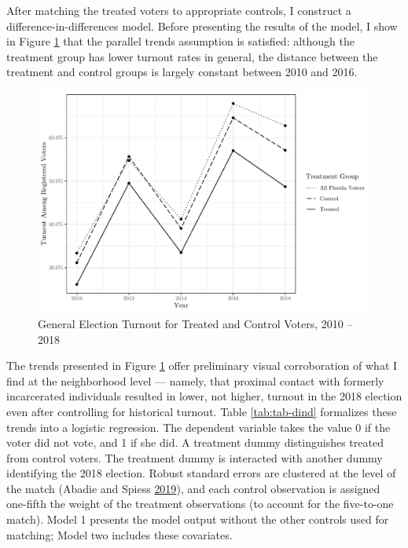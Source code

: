 \documentclass[
  12pt,
]{article}
\begin{document}
After matching the treated voters to appropriate controls, I construct a difference-in-differences model. Before presenting the results of the model, I show in Figure \ref{fig:dind} that the parallel trends assumption is satisfied: although the treatment group has lower turnout rates in general, the distance between the treatment and control groups is largely constant between 2010 and 2016.

\begin{figure}[H]

{\centering \includegraphics{amendment_4_turnout_files/figure-latex/dind-1} 

}

\caption{\label{fig:dind}General Election Turnout for Treated and Control Voters, 2010 -- 2018}\label{fig:dind}
\end{figure}

The trends presented in Figure \ref{fig:dind} offer preliminary visual corroboration of what I find at the neighborhood level --- namely, that proximal contact with formerly incarcerated individuals resulted in lower, not higher, turnout in the 2018 election even after controlling for historical turnout. Table \ref{tab:tab-dind} formalizes these trends into a logistic regression. The dependent variable takes the value 0 if the voter did not vote, and 1 if she did. A treatment dummy distinguishes treated from control voters. The treatment dummy is interacted with another dummy identifying the 2018 election. Robust standard errors are clustered at the level of the match (Abadie and Spiess \protect\hyperlink{ref-Abadie2019}{2019}), and each control observation is assigned one-fifth the weight of the treatment observations (to account for the five-to-one match). Model 1 presents the model output without the other controls used for matching; Model two includes these covariates.
\end{document}
